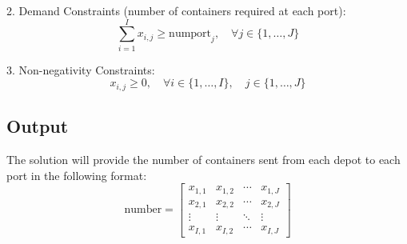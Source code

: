 \documentclass{article}
\begin{document}
2. Demand Constraints (number of containers required at each port):
\[
\sum_{i=1}^{I} x_{i,j} \geq \text{numport}_j, \quad \forall j \in \{1, \ldots, J\}
\]

3. Non-negativity Constraints:
\[
x_{i,j} \geq 0, \quad \forall i \in \{1, \ldots, I\}, \quad j \in \{1, \ldots, J\}
\]

\subsection*{Output}
The solution will provide the number of containers sent from each depot to each port in the following format:
\[
\text{number} = \begin{bmatrix}
x_{1,1} & x_{1,2} & \cdots & x_{1,J} \\
x_{2,1} & x_{2,2} & \cdots & x_{2,J} \\
\vdots & \vdots & \ddots & \vdots \\
x_{I,1} & x_{I,2} & \cdots & x_{I,J}
\end{bmatrix}
\]
\end{document}
